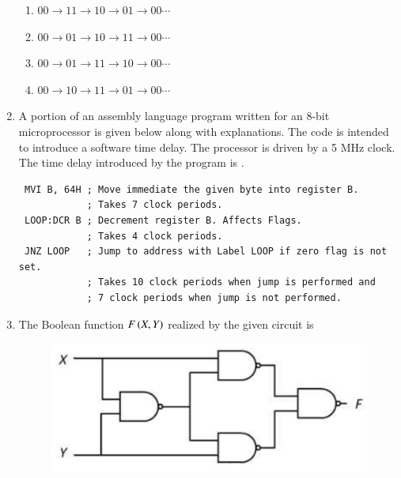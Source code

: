 \documentclass[journal,12pt,onecolumn]{IEEEtran}
\theoremstyle{remark}
\begin{document}
\begin{enumerate}
    \hfill{}
    \begin{enumerate}
        \item $00 \to 11 \to 10 \to 01 \to 00 \cdots$
        \item $00 \to 01 \to 10 \to 11 \to 00 \cdots$
        \item $00 \to 01 \to 11 \to 10 \to 00 \cdots$
        \item $00 \to 10 \to 11 \to 01 \to 00 \cdots$
    \end{enumerate}

    \item A portion of an assembly language program written for an 8-bit microprocessor is given below along with explanations. The code is intended to introduce a software time delay. The processor is driven by a 5 MHz clock. The time delay  introduced by the program is \underline{\hspace{2cm}}.
    \begin{verbatim}
 MVI B, 64H ; Move immediate the given byte into register B. 
            ; Takes 7 clock periods.
 LOOP:DCR B ; Decrement register B. Affects Flags. 
            ; Takes 4 clock periods.
 JNZ LOOP   ; Jump to address with Label LOOP if zero flag is not set.
            ; Takes 10 clock periods when jump is performed and 
            ; 7 clock periods when jump is not performed.
    \end{verbatim}
    
    \hfill{}
    
    \item The Boolean function $F\left( X, Y\right)$ realized by the given circuit is
    \begin{figure}[H]
        \centering
        \includegraphics[width=0.6\columnwidth]{q46.png}
        \caption*{}
        \label{fig:q46}
    \end{figure}
    
    \hfill{}
    \begin{enumerate}
    \end{enumerate}


\end{enumerate}
\end{document}
